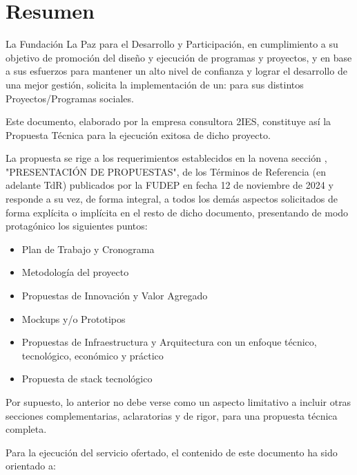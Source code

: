 \section{Resumen}

La Fundación La Paz para el Desarrollo y Participación, en cumplimiento a su objetivo de promoción del diseño y ejecución de programas y proyectos, y en base a sus esfuerzos para mantener un alto nivel de confianza y lograr el desarrollo de una mejor gestión,
solicita la implementación de un:
para sus distintos Proyectos/Programas sociales.

Este documento, elaborado por la empresa consultora 2IES, constituye así la Propuesta Técnica para la ejecución exitosa de dicho proyecto.

La propuesta se rige a los requerimientos establecidos en la novena sección , "PRESENTACIÓN DE PROPUESTAS", de los Términos de Referencia (en adelante TdR) publicados por la FUDEP en fecha 12 de noviembre de 2024 
y responde a su vez, de forma integral, a todos los demás aspectos solicitados de forma explícita o implícita en el resto de dicho documento,
presentando de modo protagónico los siguientes puntos:

\begin{itemize}
    \item Plan de Trabajo y Cronograma
    \item Metodología del proyecto
    \item Propuestas de Innovación y Valor Agregado
    \item Mockups y/o Prototipos
    \item Propuestas de Infraestructura y Arquitectura con un enfoque técnico, tecnológico, económico y práctico
    \item Propuesta de stack tecnológico
\end{itemize}

Por supuesto, lo anterior no debe verse como un aspecto limitativo a incluir otras secciones complementarias, aclaratorias y de rigor, para una propuesta técnica completa.

Para la ejecución del servicio ofertado, el contenido de este documento ha sido orientado a:


